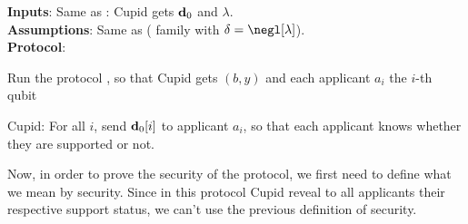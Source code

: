 \begin{protocol}[htbp]
  \caption{\blindSup{}}\label{protocol:blindSup}
  \textbf{Inputs}: Same as \blind{}: Cupid gets $\mathbf{d}_0$ and $\lambda$.\\
  \textbf{Assumptions}: Same as \blind{} (\AssumpFct{} family with $\delta = \negl[\lambda]$).\\
  \textbf{Protocol}:%
  \begin{compressedList}
    \item Run the protocol \blind{}, so that Cupid gets $(b,y)$ and each applicant $a_i$ the $i$-th qubit
    \item Cupid: For all $i$, send $\mathbf{d}_0[i]$ to applicant $a_i$, so that each applicant knows whether they are supported or not.
  \end{compressedList}
\end{protocol}

Now, in order to prove the security of the \blindSup{} protocol, we first need to define what we mean by security. Since in this protocol Cupid reveal to all applicants their respective support status, we can't use the previous definition of security.

